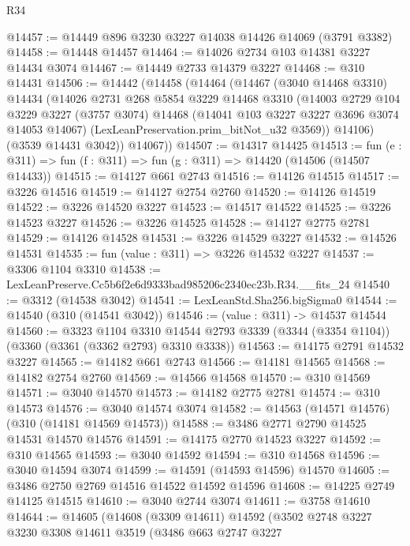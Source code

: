 \begin{lexlean}{R34}
\begin{coremodule}
@14457 := @14449 @896 @3230 @3227 @14038 @14426 @14069 (@3791 @3382)
@14458 := @14448 @14457
@14464 := @14026 @2734 @103 @14381 @3227 @14434 @3074
@14467 := @14449 @2733 @14379 @3227
@14468 := @310 @14431
@14506 := @14442
    (@14458
      (@14464
        (@14467
          (@3040 @14468 @3310)
          @14434
          (@14026
            @2731
            @268
            @5854
            @3229
            @14468
            @3310
            (@14003
              @2729
              @104
              @3229
              @3227
              (@3757 @3074)
              @14468
              (@14041 @103 @3227 @3227 @3696 @3074 @14053 @14067)
              (LexLeanPreservation.prim_bitNot_u32 @3569))
            @14106)
          (@3539 @14431 @3042))
        @14067))
@14507 := @14317 @14425
@14513 := fun (e : @311) => fun (f : @311) => fun (g : @311) => @14420 (@14506 (@14507 @14433))
@14515 := @14127 @661 @2743
@14516 := @14126 @14515
@14517 := @3226 @14516
@14519 := @14127 @2754 @2760
@14520 := @14126 @14519
@14522 := @3226 @14520 @3227
@14523 := @14517 @14522
@14525 := @3226 @14523 @3227
@14526 := @3226 @14525
@14528 := @14127 @2775 @2781
@14529 := @14126 @14528
@14531 := @3226 @14529 @3227
@14532 := @14526 @14531
@14535 := fun (value : @311) => @3226 @14532 @3227
@14537 := @3306 @1104 @3310
@14538 := LexLeanPreserve.Cc5b6f2e6d9333bad985206c2340ec23b.R34.__fits_24
@14540 := @3312 (@14538 @3042)
@14541 := LexLeanStd.Sha256.bigSigma0
@14544 := @14540 (@310 (@14541 @3042))
@14546 := (value : @311) -> @14537 @14544
@14560 := @3323
    @1104
    @3310
    @14544
    @2793
    @3339
    (@3344 (@3354 @1104))
    (@3360 (@3361 (@3362 @2793) @3310 @3338))
@14563 := @14175 @2791 @14532 @3227
@14565 := @14182 @661 @2743
@14566 := @14181 @14565
@14568 := @14182 @2754 @2760
@14569 := @14566 @14568
@14570 := @310 @14569
@14571 := @3040 @14570
@14573 := @14182 @2775 @2781
@14574 := @310 @14573
@14576 := @3040 @14574 @3074
@14582 := @14563 (@14571 @14576) (@310 (@14181 @14569 @14573))
@14588 := @3486 @2771 @2790 @14525 @14531 @14570 @14576
@14591 := @14175 @2770 @14523 @3227
@14592 := @310 @14565
@14593 := @3040 @14592
@14594 := @310 @14568
@14596 := @3040 @14594 @3074
@14599 := @14591 (@14593 @14596) @14570
@14605 := @3486 @2750 @2769 @14516 @14522 @14592 @14596
@14608 := @14225 @2749 @14125 @14515
@14610 := @3040 @2744 @3074
@14611 := @3758 @14610
@14644 := @14605
    (@14608
      (@3309 @14611)
      @14592
      (@3502
        @2748
        @3227
        @3230
        @3308
        @14611
        @3519
        (@3486
          @663
          @2747
          @3227

\end{coremodule}
\end{lexlean}
